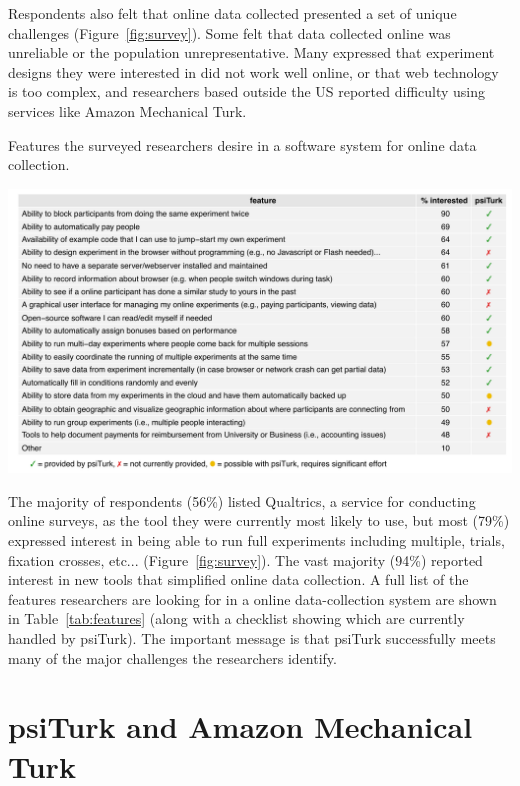 \documentclass[twocolumn]{svjour3}          %
\begin{document}
Respondents also felt that online data collected presented a set of unique challenges 
(Figure~\ref{fig:survey}).  Some felt that data collected online was unreliable or the
population unrepresentative. Many expressed that experiment designs they were interested in did
not work well online, or that web technology is too complex, and researchers based
outside the US reported difficulty using services like Amazon Mechanical Turk.

\begin{table}[tp]
\centering
\caption{Features the surveyed researchers desire in a software system for online data collection.}
\includegraphics[width=\textwidth]{figures/featuresTable.pdf}
\label{tab:features}
\end{table}


The majority of respondents (56\%) listed Qualtrics, a service for conducting online surveys, 
as the tool they were currently most likely to use, but most (79\%) expressed interest in 
being able to run full experiments including multiple, trials, fixation crosses, etc... 
(Figure~\ref{fig:survey}). The vast majority (94\%) reported interest in new tools that 
simplified online data collection. A full list of the features researchers are looking for in a 
online data-collection system are shown in Table~\ref{tab:features} (along with a checklist 
showing which are currently handled by \textsf{psiTurk}).  The important message is that
\textsf{psiTurk} successfully meets many of the major challenges the researchers identify.


\section{psiTurk and Amazon Mechanical Turk} 
\end{document}
